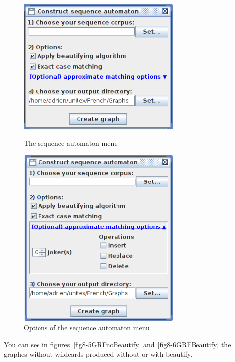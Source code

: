 \begin{figure}[h!]
	\begin{minipage}[h!]{0.5\linewidth}	
		\centering
			\includegraphics[width=8cm]{resources/img/fig8-4Menu1.png}
			\caption{The sequence automaton menu\label{fig8-4Menu1}}
	\end{minipage}	
	\hspace{0.3cm}
	\begin{minipage}[h!]{0.5\linewidth}	
		\centering
			\includegraphics[width=8cm]{resources/img/fig8-4Menu2.png}
			\caption{Options of the sequence automaton menu\label{fig8-4Menu2}}
	\end{minipage}
\end{figure}

\bigskip
\noindent You can see in figures~\ref{fig8-5GRFnoBeautify} and~\ref{fig8-6GRFBeautify} the graphes without wildcards produced without or with beautify.


